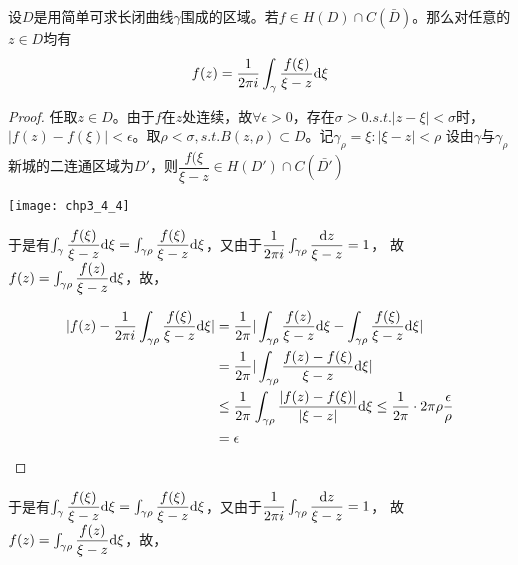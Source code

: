 \begin{theorem}
	设$D$是用简单可求长闭曲线$\gamma$围成的区域。若$f\in H(D)\cap C(\bar{D})$。那么对任意的$z\in D$均有
	\[f(z)=\dfrac{1}{2\pi i}\int_\gamma\dfrac{f(\xi)}{\xi-z}\mathrm{d}\xi\]
\end{theorem}
\begin{proof}
	任取$z\in D$。由于$f$在$z$处连续，故$\forall\epsilon>0$，存在$\sigma>0.s.t.|z-\xi|<\sigma$时，$|f(z)-f(\xi)|<\epsilon$。取$\rho<\sigma,s.t.B(z,\rho)\subset D$。记$\gamma_\rho={\xi:|\xi-z|<\rho}$
	设由$\gamma$与$\gamma_\rho$新城的二连通区域为$D'$，则$\dfrac{f(\xi}{\xi-z}\in H(D')\cap C(\bar{D'})$
	\begin{center}
		\texttt{[image: chp3\_4\_4]}
	\end{center}
	于是有$\int_\gamma\dfrac{f(\xi)}{\xi-z}\mathrm{d}\xi=\int_{\gamma\rho}\dfrac{f(\xi)}{\xi-z}\mathrm{d}\xi$，又由于$\dfrac{1}{2\pi i}\int_{\gamma\rho}\dfrac{\mathrm{d}z}{\xi-z}=1$，
	故$f(z)=\int_{\gamma\rho}\dfrac{f(z)}{\xi-z}\mathrm{d}\xi$，故，
	
	\begin{align*}
	|f(z)-\dfrac{1}{2\pi i}\int_{\gamma\rho}\dfrac{f(\xi)}{\xi-z}\mathrm{d}\xi|&=\dfrac{1}{2\pi}|\int_{\gamma\rho}\dfrac{f(z)}{\xi-z}\mathrm{d}\xi-\int_{\gamma\rho}\dfrac{f(\xi)}{\xi-z}\mathrm{d}\xi|\\
	&=\dfrac{1}{2\pi}|\int_{\gamma\rho}\dfrac{f(z)-f(\xi)}{\xi-z}\mathrm{d}\xi|\\
	&\leq\dfrac{1}{2\pi}\int_{\gamma\rho}\dfrac{|f(z)-f(\xi)|}{|\xi-z|}\mathrm{d}\xi\leq\dfrac{1}{2\pi}\cdot 2\pi \rho\dfrac{\epsilon}{\rho}\\
	&=\epsilon 
	\end{align*}
\end{proof}

于是有$\int_\gamma\dfrac{f(\xi)}{\xi-z}\mathrm{d}\xi=\int_{\gamma\rho}\dfrac{f(\xi)}{\xi-z}\mathrm{d}\xi$，又由于$\dfrac{1}{2\pi i}\int_{\gamma\rho}\dfrac{\mathrm{d}z}{\xi-z}=1$，
故$f(z)=\int_{\gamma\rho}\dfrac{f(z)}{\xi-z}\mathrm{d}\xi$，故，

